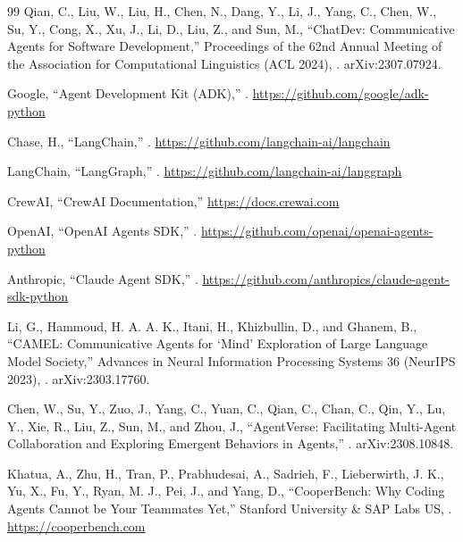 \documentclass[11pt,a4paper]{article}
\begin{document}
\begin{thebibliography}{99}
\bibspace
{}
Qian, C., Liu, W., Liu, H., Chen, N., Dang, Y., Li, J., Yang, C., Chen, W., Su, Y., Cong, X., Xu, J., Li, D., Liu, Z., and Sun, M.,
\newblock ``{ChatDev: Communicative Agents for Software Development},''
\newblock Proceedings of the 62nd Annual Meeting of the Association for Computational Linguistics (ACL 2024),
.
\newblock arXiv:2307.07924.

\bibspace
{}
Google,
\newblock ``{Agent Development Kit (ADK)},''
.
\newblock \url{https://github.com/google/adk-python}

\bibspace
{}
Chase, H.,
\newblock ``{LangChain},''
.
\newblock \url{https://github.com/langchain-ai/langchain}

\bibspace
{}
LangChain,
\newblock ``{LangGraph},''
.
\newblock \url{https://github.com/langchain-ai/langgraph}

\bibspace
{}
CrewAI,
\newblock ``{CrewAI Documentation},''
\newblock \url{https://docs.crewai.com}

\bibspace
{}
OpenAI,
\newblock ``{OpenAI Agents SDK},''
.
\newblock \url{https://github.com/openai/openai-agents-python}

\bibspace
{}
Anthropic,
\newblock ``{Claude Agent SDK},''
.
\newblock \url{https://github.com/anthropics/claude-agent-sdk-python}

\bibspace
{}
Li, G., Hammoud, H. A. A. K., Itani, H., Khizbullin, D., and Ghanem, B.,
\newblock ``{CAMEL: Communicative Agents for `Mind' Exploration of Large Language Model Society},''
\newblock Advances in Neural Information Processing Systems 36 (NeurIPS 2023),
.
\newblock arXiv:2303.17760.

\bibspace
{}
Chen, W., Su, Y., Zuo, J., Yang, C., Yuan, C., Qian, C., Chan, C., Qin, Y., Lu, Y., Xie, R., Liu, Z., Sun, M., and Zhou, J.,
\newblock ``{AgentVerse: Facilitating Multi-Agent Collaboration and Exploring Emergent Behaviors in Agents},''
.
\newblock arXiv:2308.10848.

\bibspace
{}
Khatua, A., Zhu, H., Tran, P., Prabhudesai, A., Sadrieh, F., Lieberwirth, J. K., Yu, X., Fu, Y., Ryan, M. J., Pei, J., and Yang, D.,
\newblock ``{CooperBench: Why Coding Agents Cannot be Your Teammates Yet},''
\newblock Stanford University \& SAP Labs US,
.
\newblock \url{https://cooperbench.com}


\end{thebibliography}
\end{document}
